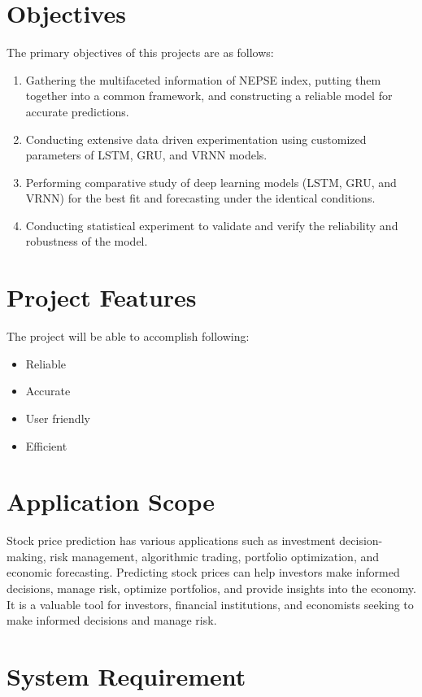 \section{Objectives}
\vspace{-18pt}
The primary objectives of this projects are as follows:
\vspace{-18pt}
\begin{enumerate}[label=\roman*.]
\item Gathering the multifaceted information of NEPSE index, putting them together into a common framework, and constructing a reliable model for accurate predictions.
\item Conducting extensive data driven experimentation using customized parameters of LSTM, GRU, and VRNN models.
\item Performing comparative study of deep learning models (LSTM, GRU, and VRNN) for the best fit and forecasting under the identical conditions.
\item Conducting statistical experiment to validate and verify the reliability and robustness of the model.
\end{enumerate}
\section{Project Features}
\vspace{-18pt}
The project will be able to accomplish following:
\vspace{-18pt}
\begin{itemize}
\item Reliable
\item Accurate
\item User friendly
\item Efficient 
\end{itemize}
\section{Application Scope}
\vspace{-18pt}
Stock price prediction has various applications such as investment decision-making, risk management, algorithmic trading, portfolio optimization, and economic forecasting. Predicting stock prices can help investors make informed decisions, manage risk, optimize portfolios, and provide insights into the economy. It is a valuable tool for investors, financial institutions, and economists seeking to make informed decisions and manage risk.
\section{System Requirement}
\vspace{-18pt}
